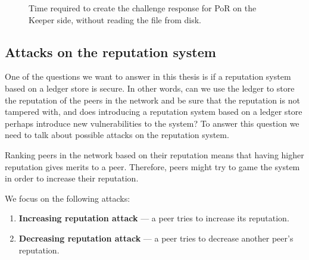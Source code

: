 \begin{figure}
  \myfloatalign
  \caption[]{Time required to create the challenge response for PoR on the Keeper side, without reading the file from disk.}
  \label{fig:por-keeper}
\end{figure}

\subsection{Attacks on the reputation system}

One of the questions we want to answer in this thesis is if a reputation system based
on a ledger store is secure.
In other words, can we use the ledger to store the reputation of the peers in the network and be sure that
the reputation is not tampered with,
and does introducing a reputation system based on a ledger store
perhaps introduce new vulnerabilities to the system?
To answer this question we need to talk about possible attacks on the reputation system.

Ranking peers in the network based on their reputation means that 
having higher reputation gives merits to a peer.
Therefore, peers might try to game the system in order to increase their reputation.

We focus on the following attacks:
\begin{enumerate}
    \item \textbf{Increasing reputation attack} --- a peer tries to increase its reputation.
    \item \textbf{Decreasing reputation attack} --- a peer tries to decrease another peer's reputation.
\end{enumerate}

